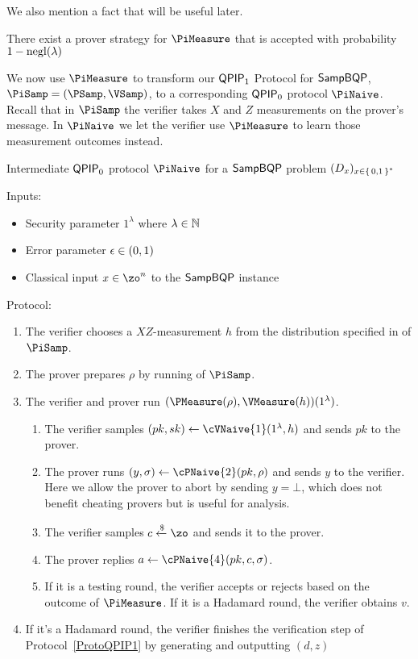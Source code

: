 We also mention a fact that will be useful later.
\begin{fact}
	\label{lem:trivial-4-round-strategy}
	There exist a prover strategy for $\PiMeasure$ that is accepted with probability $1-\operatorname{negl}(\lambda)$
\end{fact}

We now use $\PiMeasure$ to transform our $\operatorname{\mathsf{QPIP}}_1$ Protocol for $\operatorname{\mathsf{SampBQP}}$, $\PiSamp=(\PSamp, \VSamp)$, to a corresponding $\operatorname{\mathsf{QPIP}}_0$ protocol $\PiNaive$.
Recall that in $\PiSamp$ the verifier takes $X$ and $Z$ measurements on the prover's message.
In $\PiNaive$ we let the verifier use $\PiMeasure$ to learn those measurement outcomes instead.

\begin{protocol}{Intermediate $\operatorname{\mathsf{QPIP}}_0$ protocol $\PiNaive$ for a $\operatorname{\mathsf{SampBQP}}$ problem $(D_x)_{x\in\set{0, 1}^*}$}
	\label{proto:qpip0_naive}

	Inputs:
	\begin{itemize}
		\item Security parameter $1^\lambda$ where $\lambda\in\mathbb{N}$
		\item Error parameter $\epsilon\in(0, 1)$
		\item Classical input $x\in\zo^n$ to the $\operatorname{\mathsf{SampBQP}}$ instance
	\end{itemize}

	Protocol:
	\begin{enumerate}
		\item \label{step:naive1} The verifier chooses a $XZ$-measurement $h$ from the distribution specified in  of $\PiSamp$.
		\item \label{step:naive2} The prover prepares $\rho$ by running  of $\PiSamp$.
		\item \label{step:urmila-in-naive}
			The verifier and prover run $(\PMeasure(\rho), \VMeasure(h))(1^\lambda)$.
			\begin{enumerate}
				\item The verifier samples $(pk, sk)\leftarrow\cVNaive{1}(1^\lambda, h)$ and sends $pk$ to the prover.
				\item The prover runs $(y, \sigma)\leftarrow\cPNaive{2}(pk, \rho)$ and sends $y$ to the verifier.
					Here we allow the prover to abort by sending $y=\bot$, which does not benefit cheating provers but is useful for analysis.
				\item\label{step:c-urmila-in-naive} The verifier samples $c\xleftarrow{\$}\zo$ and sends it to the prover.
				\item The prover replies $a\leftarrow\cPNaive{4}(pk, c, \sigma)$.
				\item
					If it is a testing round, the verifier accepts or rejects based on the outcome of $\PiMeasure$.
					If it is a Hadamard round, the verifier obtains $v$.
			\end{enumerate}
		\item \label{step:naive-output} If it's a Hadamard round, the verifier finishes the verification step of Protocol~\ref{ProtoQPIP1} by generating and outputting $(d, z)$
	\end{enumerate}
\end{protocol}

